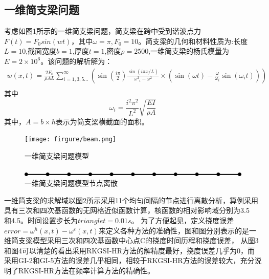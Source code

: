 \documentclass[11pt,a4paper]{article}
\begin{document}
\subsection{一维简支梁问题}
考虑如图1所示的一维简支梁问题，简支梁在跨中受到谐波点力$F(t)=F_0sin(wt)$，其中$\omega=\pi,F_0=10$。简支梁的几何和材料性质为:长度$L=10$,截面宽度$b=1$,厚度$t=1$,密度$\rho=2500$,一维简支梁的杨氏模量为$E=2\times10^6$。该问题的解析解为：
\begin{equation}
\begin{split}
    w(x,t) = \frac{{2{F_0}}}{{\rho AL}}\sum\limits_{i = 1,3,5...}^\infty  {(\sin (\frac{{i\pi }}{2})\frac{{\sin (i\pi x/L)}}{{{\omega ^2}_i - {\omega ^2}}} \times (\sin (\omega t) - \frac{\omega }{{{\omega _i}}}\sin ({\omega _i}t)))} \\ 
\end{split}
\end{equation}
其中
\begin{equation}
{\omega _i} = \frac{{{i^2}{\pi ^2}}}{{{L^2}}}\sqrt {\frac{{EI}}{{\rho A}}} 
\end{equation}
其中，$A=b\times h$表示为简支梁横截面的面积。\par
\begin{figure}[!h]
\centering
\texttt{[image: firgure/beam.png]}
\caption{一维简支梁问题模型}
\end{figure}
\begin{figure}[!h]
\includegraphics[scale=0.5]{firgure/beam.mesh.png}
\caption{一维简支梁问题模型节点离散}
\end{figure}
一维简支梁的求解域以图2所示采用11个均匀间隔的节点进行离散分析，算例采用具有三次和四次基函数的无网格近似函数计算，核函数的相对影响域分别为3.5\\和4.5。时间设置步长为$triangle t=0.01s$。
为了方便起见，定义挠度误差$error=\omega^h(x,t)-\omega^{\varepsilon}(x,t)$来定义各种方法的准确性，图和图分别表示的是一维简支梁模型采用三次和四次基函数中心点C的挠度时间历程和挠度误差，
从图3和图4可以清楚的看出采用RKGSI-HR方法的解精度最好，挠度误差几乎为0，而采用GI-2和GI-5方法的误差几乎相同，相较于RKGSI-HR方法的误差较大，充分说明了RKGSI-HR方法在频率计算方法的精确性。
\end{document}
